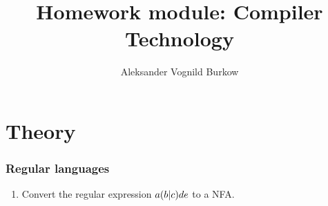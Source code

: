 \documentclass[a4paper]{article}
\title{Homework module: Compiler Technology}
\author{Aleksander Vognild Burkow}
\begin{document}
\maketitle
\thispagestyle{empty}
\newpage

\part{Theory}
\section{Regular languages}

\begin{enumerate}[label=\alph*)]
\item Convert the regular expression $ a(b|c)d\*e $ to a NFA.



\end{enumerate}
\end{document}
